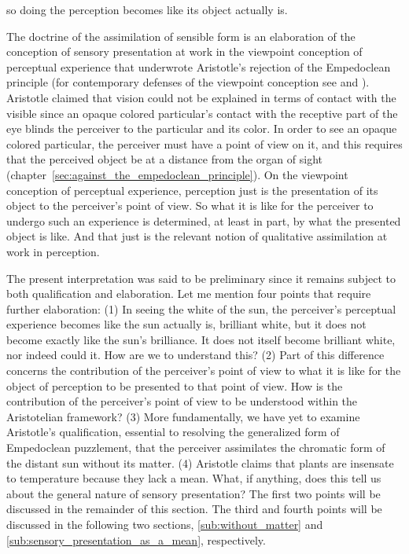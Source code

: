 so doing the perception becomes like its object actually is.

The doctrine of the assimilation of sensible form is an elaboration of the conception of sensory presentation at work in the viewpoint conception of perceptual experience that underwrote Aristotle's rejection of the Empedoclean principle (for contemporary defenses of the viewpoint conception see \citealt{Martin:1998nx} and \citealt{Kalderon:2011fk}). Aristotle claimed that vision could not be explained in terms of contact with the visible since an opaque colored particular's contact with the receptive part of the eye blinds the perceiver to the particular and its color. In order to see an opaque colored particular, the perceiver must have a point of view on it, and this requires that the perceived object be at a distance from the organ of sight (chapter~\ref{sec:against_the_empedoclean_principle}). On the viewpoint conception of perceptual experience, perception just is the presentation of its object to the perceiver's point of view. So what it is like for the perceiver to undergo such an experience is determined, at least in part, by what the presented object is like. And that just is the relevant notion of qualitative assimilation at work in perception.

The present interpretation was said to be preliminary since it remains subject to both qualification and elaboration. Let me mention four points that require further elaboration: (1) In seeing the white of the sun, the perceiver's perceptual experience becomes like the sun actually is, brilliant white, but it does not become exactly like the sun's brilliance. It does not itself become brilliant white, nor indeed could it. How are we to understand this? (2) Part of this difference concerns the contribution of the perceiver's point of view to what it is like for the object of perception to be presented to that point of view. How is the contribution of the perceiver's point of view to be understood within the Aristotelian framework? (3) More fundamentally, we have yet to examine Aristotle's qualification, essential to resolving the generalized form of Empedoclean puzzlement, that the perceiver assimilates the chromatic form of the distant sun without its matter. (4) Aristotle claims that plants are insensate to temperature because they lack a mean. What, if anything, does this tell us about the general nature of sensory presentation? The first two points will be discussed in the remainder of this section. The third and fourth points will be discussed in the following two sections, \ref{sub:without_matter} and \ref{sub:sensory_presentation_as_a_mean}, respectively.


